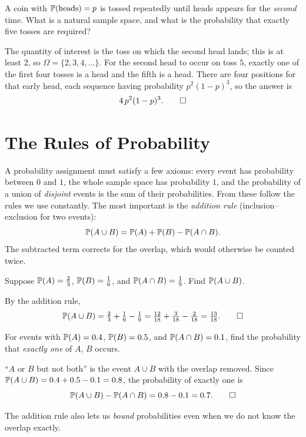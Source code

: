 \begin{example}
A coin with $\mathbb{P}(\text{heads})=p$ is tossed repeatedly until heads appears for
the \emph{second} time. What is a natural sample space, and what is the
probability that exactly five tosses are required?

\solution The quantity of interest is the toss on which the second head lands;
this is at least $2$, so $\Omega=\{2,3,4,\dots\}$. For the second head to occur
on toss $5$, exactly one of the first four tosses is a head and the fifth is a
head. There are four positions for that early head, each sequence having
probability $p^2(1-p)^3$, so the answer is
\[
  4\,p^2(1-p)^3. \qedhere
\]
\end{example}

\section{The Rules of Probability}

A probability assignment must satisfy a few axioms: every event has probability
between $0$ and $1$, the whole sample space has probability $1$, and the
probability of a union of \emph{disjoint} events is the sum of their
probabilities. From these follow the rules we use constantly. The most
important is the \emph{addition rule} (inclusion--exclusion for two events):
\[
  \mathbb{P}(A\cup B)=\mathbb{P}(A)+\mathbb{P}(B)-\mathbb{P}(A\cap B).
\]
The subtracted term corrects for the overlap, which would otherwise be counted
twice.

\begin{example}
Suppose $\mathbb{P}(A)=\tfrac23$, $\mathbb{P}(B)=\tfrac16$, and $\mathbb{P}(A\cap B)=\tfrac19$.
Find $\mathbb{P}(A\cup B)$.

\solution By the addition rule,
\[
  \mathbb{P}(A\cup B)=\tfrac23+\tfrac16-\tfrac19
   =\tfrac{12}{18}+\tfrac{3}{18}-\tfrac{2}{18}=\tfrac{13}{18}. \qedhere
\]
\end{example}

\begin{example}
For events with $\mathbb{P}(A)=0.4$, $\mathbb{P}(B)=0.5$, and $\mathbb{P}(A\cap B)=0.1$, find
the probability that \emph{exactly one} of $A$, $B$ occurs.

\solution ``$A$ or $B$ but not both'' is the event $A\cup B$ with the overlap
removed. Since $\mathbb{P}(A\cup B)=0.4+0.5-0.1=0.8$, the probability of exactly one
is
\[
  \mathbb{P}(A\cup B)-\mathbb{P}(A\cap B)=0.8-0.1=0.7. \qedhere
\]
\end{example}

The addition rule also lets us \emph{bound} probabilities even when we do not
know the overlap exactly.

